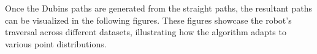\vspace*{6mm}


Once the Dubins paths are generated from the straight paths, the resultant paths can be visualized in the following figures. These figures showcase the robot's traversal across different datasets, illustrating how the algorithm adapts to various point distributions.



